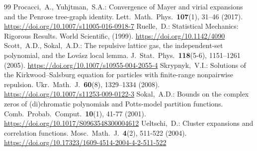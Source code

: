 \documentclass[10pt,a4paper]{amsart}
\begin{document}
\begin{thebibliography}{99}
 Procacci,~A., Yuhjtman,~S.A.: Convergence of Mayer and virial expansions and the Penrose tree-graph identity. Lett.\ Math.\ Phys.\ \textbf{107}(1), 31–46 (2017). \url{https://doi.org/10.1007/s11005-016-0918-7}
 Ruelle,~D.: Statistical Mechanics: Rigorous Results. World Scientific, (1999). \url{https://doi.org/10.1142/4090}
 Scott,~A.D., Sokal,~A.D.: The repulsive lattice gas, the independent-set polynomial, and the Lov{\'a}sz local lemma. J.\ Stat.\ Phys.\ \textbf{118}(5-6), 1151–1261 (2005). \url{https://doi.org/10.1007/s10955-004-2055-4}
 Skrypnyk,~V.I.: Solutions of the Kirkwood--Salsburg equation for particles with finite-range nonpairwise repulsion. Ukr.\ Math.\ J.\ \textbf{60}(8), 1329–1334 (2008). \url{https://doi.org/10.1007/s11253-009-0122-3}
 Sokal,~A.D.: Bounds on the complex zeros of (di)chromatic polynomials and Potts-model partition functions. Comb.\ Probab.\ Comput.\ \textbf{10}(1), 41-77 (2001). \url{https://doi.org/10.1017/S0963548300004612}
 Ueltschi,~D.: Cluster expansions and correlation functions. Mosc.\ Math.\ J.\ \textbf{4}(2), 511-522 (2004). \url{https://doi.org/10.17323/1609-4514-2004-4-2-511-522}
\end{thebibliography}
\end{document}
